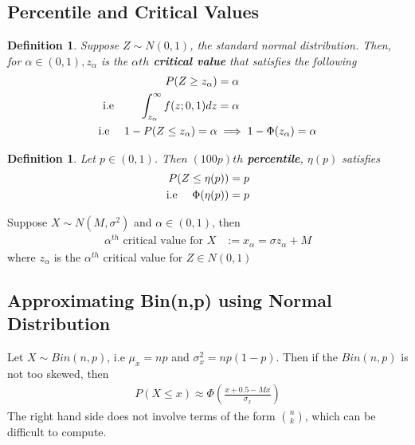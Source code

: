 \documentclass[11pt,oneside]{book}
\theoremstyle{newStyle}
\newtheorem{defn}[thm]{Definition}
\begin{document}
\subsection[Percentile and Critical Values]{Percentile and Critical Values}
\begin{defn}
Suppose $Z\sim N(0,1)$, the standard normal distribution. Then, for $\alpha \in (0,1),z_{\alpha}$ is the $\alpha th$ \textbf{critical value} that satisfies the following \begin{align*}
P(Z\geq z_{\alpha}) &=\alpha\\
\text{i.e \qquad} \int_{z_{\alpha}}^{\infty}f(z;0,1)dz&=\alpha\\
\text{i.e \quad} 1-P(Z\leq z_{\alpha})=\alpha&\implies 1-\Phi(z_{\alpha})=\alpha
\end{align*}
\end{defn}
\begin{defn}
Let $p\in (0,1)$. Then $(100p)th$ \textbf{percentile}, $\eta (p)$ satisfies \begin{align*}
P(Z\leq \eta (p))&=p\\
\text{i.e \quad}\Phi(\eta(p))&=p
\end{align*} 
\end{defn}
Suppose $X\sim N(M,\sigma^2)$ and $\alpha \in (0,1)$, then \begin{align*}
\alpha^{th}\text{ critical value for }X&:= x_{\alpha}=\sigma z_{\alpha}+M 
\end{align*}
where $z_{\alpha}$ is the $\alpha^{th}$ critical value for $Z\in N(0,1)$
\subsection[Approximating Bin(n,p) using Normal Distribution]{Approximating Bin(n,p) using Normal Distribution}
Let $X\sim Bin(n,p)$, i.e $\mu_x=np$ and $\sigma_x^2=np(1-p)$. Then if the $Bin(n,p)$ is not too skewed, then \begin{align*}
P(X\leq x)\approx \Phi \left(\frac{x+0.5-Mx}{\sigma_x} \right)
\end{align*}
The right hand side does not involve terms of the form $\binom nk$, which can be difficult to compute.
\end{document}
